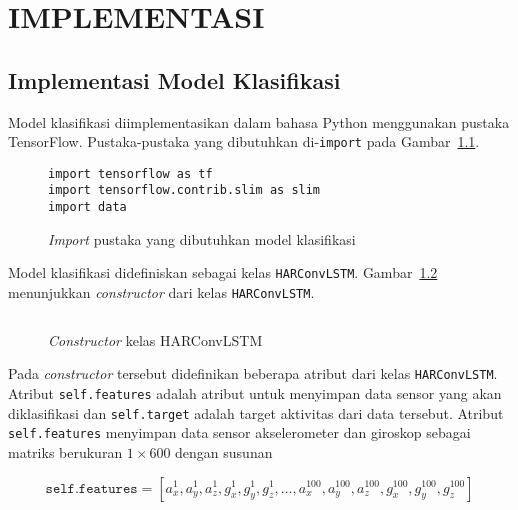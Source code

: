 \chapter{IMPLEMENTASI}

\section{Implementasi Model Klasifikasi}
Model klasifikasi diimplementasikan dalam bahasa Python menggunakan pustaka TensorFlow. Pustaka-pustaka yang dibutuhkan di-\texttt{import} pada Gambar~\ref{listing:har-import}.

\begin{figure}[h]
\begin{verbatim}
import tensorflow as tf
import tensorflow.contrib.slim as slim
import data
\end{verbatim}
\caption{\textit{Import} pustaka yang dibutuhkan model klasifikasi}
\label{listing:har-import}
\end{figure}


Model klasifikasi didefiniskan sebagai kelas \texttt{HARConvLSTM}. Gambar~\ref{listing:har-HARConvLSTM-constructor} menunjukkan \textit{constructor} dari kelas \texttt{HARConvLSTM}.

\begin{figure}[h]
    \inputminted[firstline=14,firstnumber=14,lastline=31,fontsize=\scriptsize]{python}{../har/har.py}
    \caption{\textit{Constructor} kelas HARConvLSTM}
    \label{listing:har-HARConvLSTM-constructor}
\end{figure}

Pada \textit{constructor} tersebut didefinikan beberapa atribut dari kelas \texttt{HARConvLSTM}. Atribut \texttt{self.features} adalah atribut untuk menyimpan data sensor yang akan diklasifikasi dan \texttt{self.target} adalah target aktivitas dari data tersebut. Atribut \texttt{self.features} menyimpan data sensor akselerometer dan giroskop sebagai matriks berukuran $1 \times 600$ dengan susunan

\begin{equation}
    \texttt{self.features} = [a_x^1, a_y^1, a_z^1, g_x^1, g_y^1, g_z^1,\dots, a_x^{100}, a_y^{100}, a_z^{100}, g_x^{100}, g_y^{100}, g_z^{100}]
\end{equation}

